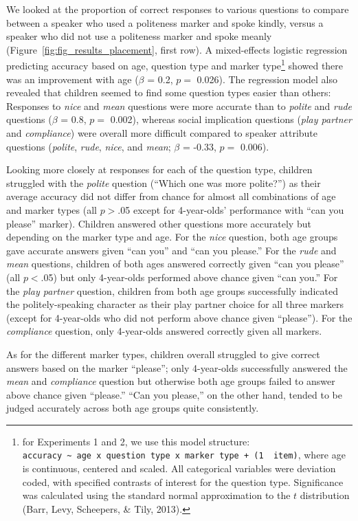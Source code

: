\documentclass[10pt, letterpaper]{article}
\begin{document}
We looked at the proportion of correct responses to various questions to
compare between a speaker who used a politeness marker and spoke kindly,
versus a speaker who did not use a politeness marker and spoke meanly
(Figure~\ref{fig:fig_results_placement}, first row). A mixed-effects
logistic regression predicting accuracy based on age, question type and
marker type\footnote{for Experiments 1 and 2, we use this model
  structure:
  \texttt{accuracy\ \textasciitilde{}\ age\ x\ question\ type\ x\ marker\ type\ +\ (1\ \textbar{}\ item)},
  where age is continuous, centered and scaled. All categorical
  variables were deviation coded, with specified contrasts of interest
  for the question type. Significance was calculated using the standard
  normal approximation to the \(t\) distribution (Barr, Levy, Scheepers,
  \& Tily, 2013).} showed there was an improvement with age (\(\beta\) =
0.2, \(p =\) 0.026). The regression model also revealed that children
seemed to find some question types easier than others: Responses to
\emph{nice} and \emph{mean} questions were more accurate than to
\emph{polite} and \emph{rude} questions (\(\beta\) = 0.8, \(p =\)
0.002), whereas social implication questions (\emph{play partner} and
\emph{compliance}) were overall more difficult compared to speaker
attribute questions (\emph{polite}, \emph{rude}, \emph{nice}, and
\emph{mean}; \(\beta\) = -0.33, \(p =\) 0.006).

Looking more closely at responses for each of the question type,
children struggled with the \emph{polite} question (``Which one was more
polite?'') as their average accuracy did not differ from chance for
almost all combinations of age and marker types (all \(p>\).05 except
for 4-year-olds' performance with ``can you please'' marker). Children
answered other questions more accurately but depending on the marker
type and age. For the \emph{nice} question, both age groups gave
accurate answers given ``can you'' and ``can you please.'' For the
\emph{rude} and \emph{mean} questions, children of both ages answered
correctly given ``can you please'' (all \(p<\).05) but only 4-year-olds
performed above chance given ``can you.'' For the \emph{play partner}
question, children from both age groups successfully indicated the
politely-speaking character as their play partner choice for all three
markers (except for 4-year-olds who did not perform above chance given
``please''). For the \emph{compliance} question, only 4-year-olds
answered correctly given all markers.

As for the different marker types, children overall struggled to give
correct answers based on the marker ``please''; only 4-year-olds
successfully answered the \emph{mean} and \emph{compliance} question but
otherwise both age groups failed to answer above chance given
``please.'' ``Can you please,'' on the other hand, tended to be judged
accurately across both age groups quite consistently.
\end{document}
